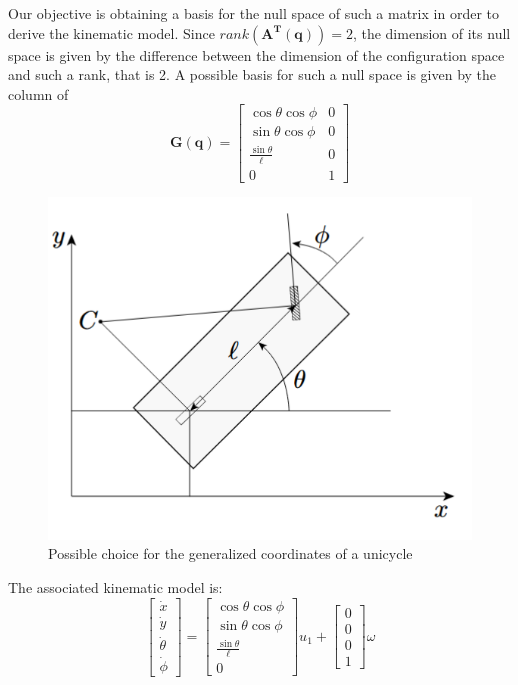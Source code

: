 \begin{multicols}{2}
    
\noindent 
Our objective is obtaining a basis for the null space of such a matrix in order to derive the kinematic model. Since $rank(\mathbf{A^T(q)})=2$, the dimension of its null space is given by the difference between the dimension of the configuration space and such a rank, that is 2. A possible basis for such a null space is given by the column of
\begin{equation}
    \mathbf{G(q)}=\begin{bmatrix}
        \cos\theta\cos\phi&0\\
        \sin\theta\cos\phi&0\\
        \frac{\sin\theta}{\ell}&0\\
        0&1
    \end{bmatrix}
\end{equation}
\begin{figure}[H]
    \centering
    \includegraphics[scale=0.6]{img/bicycle_scheme.png}
    \caption{Possible choice for the generalized coordinates of a unicycle}    
    \label{fig:scheme_bicycle}
\end{figure}
\end{multicols}
\noindent
The associated kinematic model is:
\begin{equation}
    \begin{bmatrix}
        \dot{x}\\
        \dot{y}\\
        \dot{\theta}\\
        \dot{\phi}
    \end{bmatrix}=\begin{bmatrix}
        \cos\theta\cos\phi\\
        \sin\theta\cos\phi\\
        \frac{\sin\theta}{\ell}\\
        0
    \end{bmatrix}u_1 + \begin{bmatrix}
        0\\
        0\\
        0\\1
    \end{bmatrix}\omega
\end{equation}
